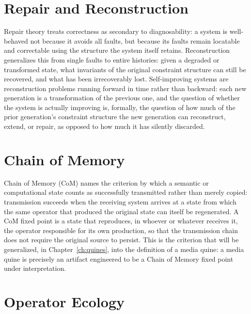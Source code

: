 \documentclass[11pt]{book}
\begin{document}
\section{Repair and Reconstruction}

Repair theory treats correctness as secondary to diagnosability: a system is well-behaved not because it avoids all faults, but because its faults remain locatable and correctable using the structure the system itself retains. Reconstruction generalizes this from single faults to entire histories: given a degraded or transformed state, what invariants of the original constraint structure can still be recovered, and what has been irrecoverably lost. Self-improving systems are reconstruction problems running forward in time rather than backward: each new generation is a transformation of the previous one, and the question of whether the system is actually improving is, formally, the question of how much of the prior generation's constraint structure the new generation can reconstruct, extend, or repair, as opposed to how much it has silently discarded.

\section{Chain of Memory}

Chain of Memory (CoM) names the criterion by which a semantic or computational state counts as successfully transmitted rather than merely copied: transmission succeeds when the receiving system arrives at a state from which the same operator that produced the original state can itself be regenerated. A CoM fixed point is a state that reproduces, in whoever or whatever receives it, the operator responsible for its own production, so that the transmission chain does not require the original source to persist. This is the criterion that will be generalized, in Chapter~\ref{ch:quines}, into the definition of a media quine: a media quine is precisely an artifact engineered to be a Chain of Memory fixed point under interpretation.

\section{Operator Ecology}
\end{document}
